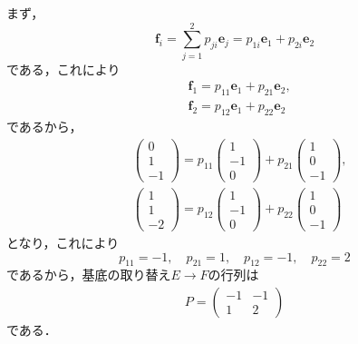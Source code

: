 \documentclass[a4paper,10pt,fleqn]{ltjsarticle}
\begin{document}
\begin{leftbar}
  まず，
  \begin{equation*}
    \bm{f}_i=\sum^{2}_{j=1}p_{ji}\bm{e}_{j}=p_{1i}\bm{e}_1+p_{2i}\bm{e}_2
  \end{equation*}
  である，これにより
  \begin{align*}
     & \bm{f}_1=p_{11}\bm{e}_1+p_{21}\bm{e}_2, \\
     & \bm{f}_2=p_{12}\bm{e}_1+p_{22}\bm{e}_2
  \end{align*}
  であるから，
  \begin{align*}
     &
    \begin{pmatrix}
      0 \\
      1 \\
      -1
    \end{pmatrix}
    =
    p_{11}
    \begin{pmatrix}
      1  \\
      -1 \\
      0
    \end{pmatrix}
    +p_{21}
    \begin{pmatrix}
      1 \\
      0 \\
      -1
    \end{pmatrix}
    ,  \\
     &
    \begin{pmatrix}
      1 \\
      1 \\
      -2
    \end{pmatrix}
    =
    p_{12}
    \begin{pmatrix}
      1  \\
      -1 \\
      0
    \end{pmatrix}
    +p_{22}
    \begin{pmatrix}
      1 \\
      0 \\
      -1
    \end{pmatrix}
  \end{align*}
  となり，これにより
  \[
    p_{11}=-1,\quad p_{21}=1,\quad p_{12}=-1,\quad p_{22}=2
  \]
  であるから，基底の取り替え$E \to F$の行列は
  \begin{align*}
    P=
    \begin{pmatrix}
      -1 & -1 \\
      1  & 2
    \end{pmatrix}
  \end{align*}
  である．
\end{leftbar}
\end{document}
